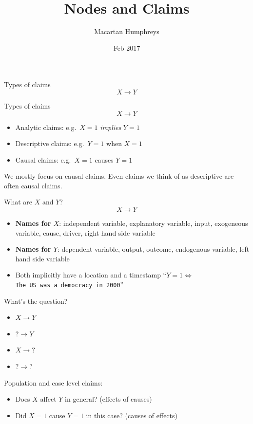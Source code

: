 \documentclass[
  11pt,
  ignorenonframetext,
]{beamer}
\title{Nodes and Claims}
\author{Macartan Humphreys}
\date{Feb 2017}
\providecommand{\tightlist}{%
  \setlength{\itemsep}{0pt}\setlength{\parskip}{0pt}}
\begin{document}
\frame{\titlepage}

\begin{frame}{Types of claims}
\protect\hypertarget{types-of-claims}{}
\[X \rightarrow Y\]
\end{frame}

\begin{frame}{Types of claims}
\protect\hypertarget{types-of-claims-1}{}
\[X \rightarrow Y\]

\begin{itemize}
\tightlist
\item
  Analytic claims: e.g.~\(X=1\) \emph{implies} \(Y=1\)
\item
  Descriptive claims: e.g.~\(Y=1\) when \(X=1\)
\item
  Causal claims: e.g.~\(X=1\) causes \(Y=1\)
\end{itemize}

We mostly focus on causal claims. Even claims we think of as descriptive
are often causal claims.
\end{frame}

\begin{frame}[fragile]{What are \(X\) and \(Y\)?}
\protect\hypertarget{what-are-x-and-y}{}
\[X \rightarrow Y\]

\begin{itemize}
\item
  \textbf{Names for \(X\)}: independent variable, explanatory variable,
  input, exogeneous variable, cause, driver, right hand side variable
\item
  \textbf{Names for \(Y\)}: dependent variable, output, outcome,
  endogenous variable, left hand side variable
\item
  Both implicitly have a location and a timestamp
  ``\(Y=1 \Leftrightarrow\)
  \texttt{The\ US\ was\ a\ democracy\ in\ 2000}''
\end{itemize}
\end{frame}

\begin{frame}{What's the question?}
\protect\hypertarget{whats-the-question}{}
\begin{itemize}
\tightlist
\item
  \(X \rightarrow Y\)
\item
  \(? \rightarrow Y\)
\item
  \(X \rightarrow ?\)
\item
  \(? \rightarrow ?\)
\end{itemize}

Population and case level claims:

\begin{itemize}
\tightlist
\item
  Does \(X\) affect \(Y\) in general? (effects of causes)
\item
  Did \(X=1\) cause \(Y=1\) in this case? (causes of effects)
\end{itemize}
\end{frame}
\end{document}
